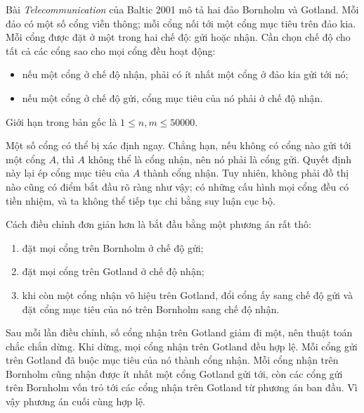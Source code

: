 \documentclass[11pt]{article}
\begin{document}
Bài \textit{Telecommunication} của Baltic 2001 mô tả hai đảo Bornholm và
Gotland. Mỗi đảo có một số cổng viễn thông; mỗi cổng nối tới một cổng mục tiêu
trên đảo kia. Mỗi cổng được đặt ở một trong hai chế độ: gửi hoặc nhận. Cần
chọn chế độ cho tất cả các cổng sao cho mọi cổng đều hoạt động:
\begin{itemize}
  \item nếu một cổng ở chế độ nhận, phải có ít nhất một cổng ở đảo kia gửi tới
  nó;
  \item nếu một cổng ở chế độ gửi, cổng mục tiêu của nó phải ở chế độ nhận.
\end{itemize}
Giới hạn trong bản gốc là \(1\le n,m\le 50000\).

Một số cổng có thể bị xác định ngay. Chẳng hạn, nếu không có cổng nào gửi tới
một cổng \(A\), thì \(A\) không thể là cổng nhận, nên nó phải là cổng gửi.
Quyết định này lại ép cổng mục tiêu của \(A\) thành cổng nhận. Tuy nhiên,
không phải đồ thị nào cũng có điểm bắt đầu rõ ràng như vậy; có những cấu hình
mọi cổng đều có tiền nhiệm, và ta không thể tiếp tục chỉ bằng suy luận cục bộ.

Cách điều chỉnh đơn giản hơn là bắt đầu bằng một phương án rất thô:
\begin{enumerate}
  \item đặt mọi cổng trên Bornholm ở chế độ gửi;
  \item đặt mọi cổng trên Gotland ở chế độ nhận;
  \item khi còn một cổng nhận vô hiệu trên Gotland, đổi cổng ấy sang chế độ
  gửi và đặt cổng mục tiêu của nó trên Bornholm sang chế độ nhận.
\end{enumerate}

Sau mỗi lần điều chỉnh, số cổng nhận trên Gotland giảm đi một, nên thuật toán
chắc chắn dừng. Khi dừng, mọi cổng nhận trên Gotland đều hợp lệ. Mỗi cổng gửi
trên Gotland đã buộc mục tiêu của nó thành cổng nhận. Mỗi cổng nhận trên
Bornholm cũng nhận được ít nhất một cổng Gotland gửi tới, còn các cổng gửi
trên Bornholm vốn trỏ tới các cổng nhận trên Gotland từ phương án ban đầu.
Vì vậy phương án cuối cùng hợp lệ.
\end{document}
